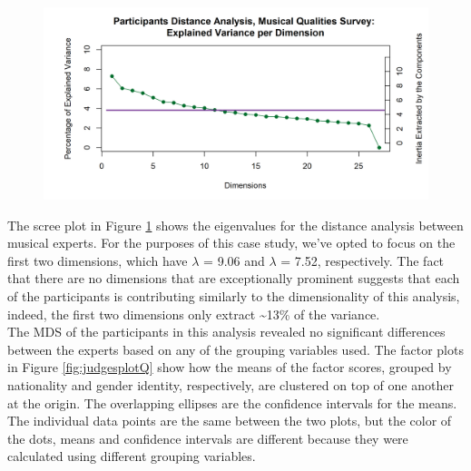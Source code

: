 \documentclass[
  english,
  man,floatsintext]{apa6}
\begin{document}
\begin{figure}  
  \begin{center}
    \includegraphics{./Music-Descriptor-Space_files/figure-latex/screeRV-1.png}
  \caption{ }\label{fig:screeRVQ}  
 \end{center}
\end{figure}

The scree plot in Figure \ref{fig:screeRVQ} shows the eigenvalues for the distance analysis between musical experts. For the purposes of this case study, we've opted to focus on the first two dimensions, which have \(\lambda\) = 9.06 and \(\lambda\) = 7.52, respectively. The fact that there are no dimensions that are exceptionally prominent suggests that each of the participants is contributing similarly to the dimensionality of this analysis, indeed, the first two dimensions only extract \textasciitilde13\% of the variance.\\
The MDS of the participants in this analysis revealed no significant differences between the experts based on any of the grouping variables used. The factor plots in Figure \ref{fig:judgesplotQ} show how the means of the factor scores, grouped by nationality and gender identity, respectively, are clustered on top of one another at the origin. The overlapping ellipses are the confidence intervals for the means. The individual data points are the same between the two plots, but the color of the dots, means and confidence intervals are different because they were calculated using different grouping variables.
\end{document}
